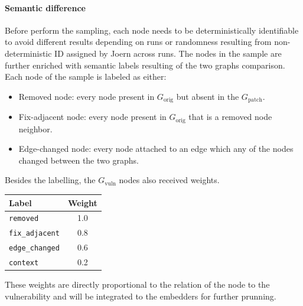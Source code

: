 \documentclass[11pt, a4paper]{article}
\begin{document}
\paragraph{Semantic difference}
Before perform the sampling, each node needs to be deterministically identifiable to avoid different results depending on runs or randomness resulting from non-deterministic ID assigned by Joern across runs.
The nodes in the sample are further enriched with semantic labels resulting of the two graphs comparison.
Each node of the sample is labeled as either:
\begin{itemize}
  \item Removed node: every node present in $G_\mathrm{orig}$ but absent in the $G_\mathrm{patch}$.
  \item Fix-adjacent node: every node present in $G_\mathrm{orig}$ that is a removed node neighbor.
  \item Edge-changed node: every node attached to an edge which any of the nodes changed between the two graphs. 
\end{itemize}

Besides the labelling, the $G_\mathrm{vuln}$ nodes also received weights. 
\begin{center}
\begin{tabular}{lc}
  \textbf{Label} & \textbf{Weight} \\
  \hline
  \texttt{removed}       & 1.0 \\
  \texttt{fix\_adjacent} & 0.8 \\
  \texttt{edge\_changed} & 0.6 \\
  \texttt{context}       & 0.2 \\
\end{tabular}
\end{center}

These weights are directly proportional to the relation of the node to the vulnerability and will be integrated to the embedders for further prunning.
\end{document}
